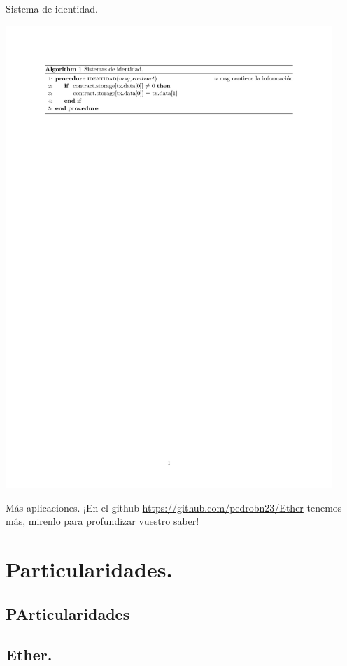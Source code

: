 \documentclass[usenames,dvipsnames]{beamer}
\begin{document}
\begin{frame}{ Sistema de identidad. }

\includegraphics[height=17.5cm]{./images/alg2.png}
\end{frame}
\begin{frame}{ Más aplicaciones. }
	¡En el github \url{https://github.com/pedrobn23/Ether} tenemos más, mirenlo para profundizar vuestro saber!
\end{frame}

\section{ Particularidades. }
\subsection{PArticularidades}
\subsection{ Ether. }
\end{document}
